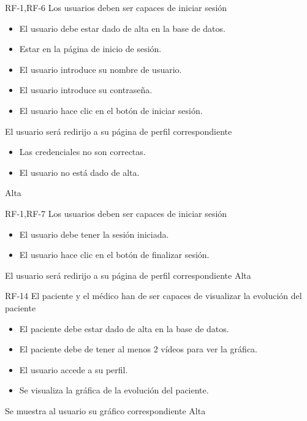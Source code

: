 {RF-1,RF-6}
{Los usuarios deben ser capaces de iniciar sesión}
{	\begin{itemize}
	\def\labelenumi{\arabic{enumi}.}
	\tightlist
	\item El usuario debe estar dado de alta en la base de datos.
	\item Estar en la página de inicio de sesión.
	\end{itemize}}
{
	\begin{itemize}
	\def\labelenumi{\arabic{enumi}.}
	\tightlist

    \item El usuario introduce su nombre de usuario.
    \item El usuario introduce su contraseña.
    \item El usuario hace clic en el botón de iniciar sesión.
    \end{itemize}
}
{El usuario será redirijo a su página de perfil correspondiente}
{	\begin{itemize}
	\def\labelenumi{\arabic{enumi}.}
	\tightlist

    \item Las credenciales no son correctas.
    \item El usuario no está dado de alta.
    \end{itemize}}
{Alta}

{RF-1,RF-7}
{Los usuarios deben ser capaces de iniciar sesión}
{	\begin{itemize}
	\def\labelenumi{\arabic{enumi}.}
	\tightlist
	\item El usuario debe tener la sesión iniciada.
	\end{itemize}}
{
	\begin{itemize}
	\def\labelenumi{\arabic{enumi}.}
	\tightlist

    \item El usuario hace clic en el botón de finalizar sesión.
    \end{itemize}
}
{El usuario será redirijo a su página de perfil correspondiente}
{}
{Alta}

{RF-14}
{El paciente y el médico han de ser capaces de visualizar la evolución del paciente}
{	\begin{itemize}
	\def\labelenumi{\arabic{enumi}.}
	\tightlist
	\item El paciente debe estar dado de alta en la base de datos.
	\item El paciente debe de tener al menos 2 vídeos para ver la gráfica.
	\end{itemize}}
{
	\begin{itemize}
	\def\labelenumi{\arabic{enumi}.}
	\tightlist

    \item El usuario accede a su perfil.
    \item Se visualiza la gráfica de la evolución del paciente.
    \end{itemize}
}
{Se muestra al usuario su gráfico correspondiente}
{}
{Alta}

